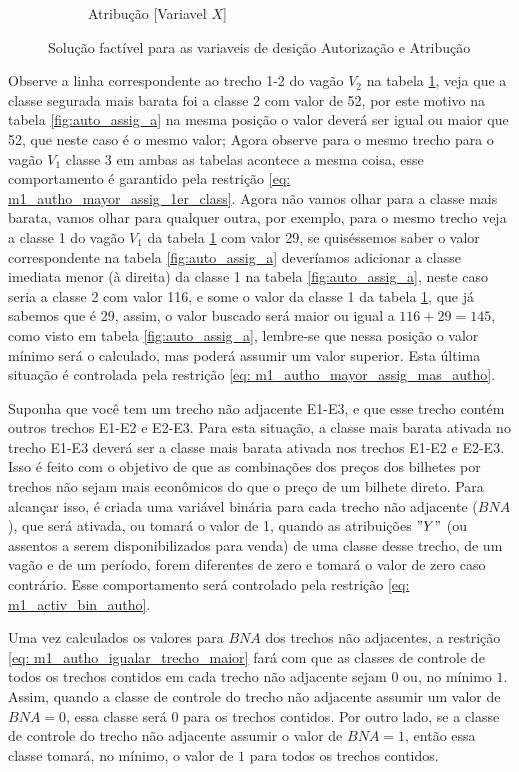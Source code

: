 \begin{figure}[h!]
\begin{subfigure}[b]{0.35\linewidth}
		\caption{Atribução [Variavel $X$]}
		\label{fig:auto_assig_b}
	\end{subfigure}
	\caption{Solução factível para as variaveis de desição Autorização e Atribução}
	\label{fig:auto_assig}
\end{figure}

Observe a linha correspondente ao trecho 1-2 do vagão $V_2$ na tabela \ref{fig:auto_assig_b}, veja que a classe segurada mais barata foi a classe 2 com valor de 52, por este motivo na tabela \ref{fig:auto_assig_a} na mesma posição o valor deverá ser igual ou maior que 52, que neste caso é o mesmo valor; Agora observe para o mesmo trecho para o vagão $V_1$ classe 3 em ambas as tabelas acontece a mesma coisa, esse comportamento é garantido pela restrição \ref{eq: m1_autho_mayor_assig_1er_class}. Agora não vamos olhar para a classe mais barata, vamos olhar para qualquer outra, por exemplo, para o mesmo trecho veja a classe 1 do vagão $V_1$ da tabela \ref{fig:auto_assig_b} com valor 29, se quiséssemos saber o valor correspondente na tabela \ref{fig:auto_assig_a} deveríamos adicionar a classe imediata menor (à direita) da classe 1 na tabela \ref{fig:auto_assig_a}, neste caso seria a classe 2 com valor 116, e some o valor da classe 1 da tabela \ref{fig:auto_assig_b}, que já sabemos que é 29, assim, o valor buscado será maior ou igual a $116+29 = 145$, como visto em tabela \ref{fig:auto_assig_a}, lembre-se que nessa posição o valor mínimo será o calculado, mas poderá assumir um valor superior. Esta última situação é controlada pela restrição \ref{eq: m1_autho_mayor_assig_mas_autho}.

Suponha que você tem um trecho não adjacente E1-E3, e que esse trecho contém outros trechos E1-E2 e E2-E3. Para esta situação, a classe mais barata ativada no trecho E1-E3 deverá ser a classe mais barata ativada nos trechos E1-E2 e E2-E3. Isso é feito com o objetivo de que as combinações dos preços dos bilhetes por trechos não sejam mais econômicos do que o preço de um bilhete direto. Para alcançar isso, é criada uma variável binária para cada trecho não adjacente ($BNA$), que será ativada, ou tomará o valor de 1, quando as atribuições $"Y"$ (ou assentos a serem disponibilizados para venda) de uma classe desse trecho, de um vagão e de um período, forem diferentes de zero e tomará o valor de zero caso contrário. Esse comportamento será controlado pela restrição \ref{eq: m1_activ_bin_autho}.

Uma vez calculados os valores para $BNA$ dos trechos não adjacentes, a restrição \ref{eq: m1_autho_igualar_trecho_maior} fará com que as classes de controle de todos os trechos contidos em cada trecho não adjacente sejam $0$ ou, no mínimo $1$. Assim, quando a classe de controle do trecho não adjacente assumir um valor de $BNA = 0$, essa classe será $0$ para os trechos contidos. Por outro lado, se a classe de controle do trecho não adjacente assumir o valor de $BNA = 1$, então essa classe tomará, no mínimo, o valor de $1$ para todos os trechos contidos.

